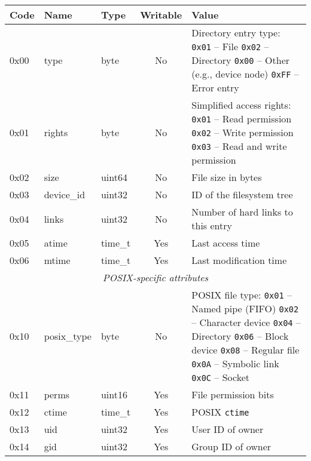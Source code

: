 \begin{table}
\begin{center}

\def\tline#1#2#3{
{\ttfamily #1} & {\ttfamily #2} & {\ttfamily #3}
}
\begin{tabular}{lllcp{6cm}}
	\hline
	Code & Name & Type & Writable & Value \\
	\hline
	\tline{0x00}{type}{byte} & No &
		Directory entry type: \newline
		{\tt 0x01} -- File \newline
		{\tt 0x02} -- Directory \newline
		{\tt 0x00} -- Other (e.g., device node) \newline
		{\tt 0xFF} -- Error entry
		\\
	\tline{0x01}{rights}{byte} & No &
		Simplified access rights:\newline
		{\tt 0x01} -- Read permission \newline
		{\tt 0x02} -- Write permission \newline
		{\tt 0x03} -- Read and write permission
		\\
	\tline{0x02}{size}{uint64} & No & File size in bytes \\
	\tline{0x03}{device\_id}{uint32} & No & ID of the filesystem tree\footnotemark[1] \\
	\tline{0x04}{links}{uint32} & No & Number of hard links to this entry \\
	\tline{0x05}{atime}{time\_t} & Yes & Last access time \\
	\tline{0x06}{mtime}{time\_t} & Yes & Last modification time \\

	\hline
	\multicolumn{5}{c}{\textit{POSIX-specific attributes}} \\
	\hline

	\tline{0x10}{posix\_type}{byte} & No &
		POSIX file type:\footnotemark[2] \newline
		{\tt 0x01} -- Named pipe (FIFO) \newline
		{\tt 0x02} -- Character device \newline
		{\tt 0x04} -- Directory \newline
		{\tt 0x06} -- Block device \newline
		{\tt 0x08} -- Regular file \newline
		{\tt 0x0A} -- Symbolic link \newline
		{\tt 0x0C} -- Socket
		\\
	\tline{0x11}{perms}{uint16} & Yes & File permission bits\footnotemark[3] \\
	\tline{0x12}{ctime}{time\_t} & Yes & POSIX {\tt ctime} \\
	\tline{0x13}{uid}{uint32} & Yes & User ID of owner \\
	\tline{0x14}{gid}{uint32} & Yes & Group ID of owner \\


\end{tabular}
\end{center}
\end{table}
